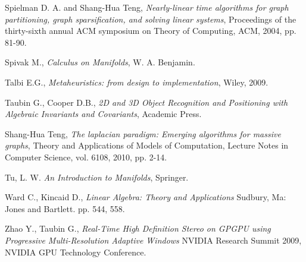\documentclass[conference,compsoc,a4paper]{IEEEtran}
\begin{document}
\begin{thebibliography}{1}
Spielman D. A. and Shang-Hua Teng,
\newblock \textit{Nearly-linear time algorithms for graph partitioning, graph 
sparsification, and solving linear systems}, 
\newblock Proceedings of the thirty-sixth annual ACM symposium on Theory of 
Computing, ACM, 2004, pp. 81-90.

Spivak M.,
\newblock \textit{Calculus on Manifolds},
\newblock W. A. Benjamin.

Talbi E.G., 
\newblock \textit{Metaheuristics: from design to implementation}, 
\newblock Wiley, 2009.

Taubin G., Cooper D.B., 
\newblock \textit{2D and 3D Object Recognition and Positioning with 
Algebraic Invariants and Covariants}, 
\newblock Academic Press.


Shang-Hua Teng,
\newblock \textit{The laplacian paradigm: Emerging algorithms for massive 
graphs}, 
\newblock Theory and Applications of Models of Computation, Lecture Notes in 
Computer Science, vol. 6108, 2010, pp. 2-14.

Tu, L. W. 
\newblock \textit{An Introduction to Manifolds},
\newblock Springer.

Ward C., Kincaid D., 
\newblock \textit{Linear Algebra: Theory and Applications}
\newblock Sudbury, Ma: Jones and Bartlett. pp. 544, 558.

Zhao Y., Taubin G., 
\newblock \textit{Real-Time High Definition Stereo on GPGPU using 
Progressive Multi-Resolution Adaptive Windows}
\newblock NVIDIA Research Summit 2009, NVIDIA GPU Technology Conference.


\end{thebibliography}

\end{document}
